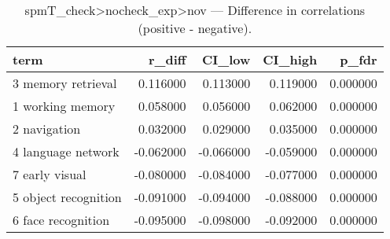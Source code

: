 \begin{table}
\caption{spmT_check>nocheck_exp>nov — Difference in correlations (positive - negative).}
\label{tab:spmT_check>nocheck_exp>nov_diff}
\begin{tabular}{lrrrr}
\toprule
term & r\_diff & CI\_low & CI\_high & p\_fdr \\
\midrule
3 memory retrieval & 0.116000 & 0.113000 & 0.119000 & 0.000000 \\
1 working memory & 0.058000 & 0.056000 & 0.062000 & 0.000000 \\
2 navigation & 0.032000 & 0.029000 & 0.035000 & 0.000000 \\
4 language network & -0.062000 & -0.066000 & -0.059000 & 0.000000 \\
7 early visual & -0.080000 & -0.084000 & -0.077000 & 0.000000 \\
5 object recognition & -0.091000 & -0.094000 & -0.088000 & 0.000000 \\
6 face recognition & -0.095000 & -0.098000 & -0.092000 & 0.000000 \\
\bottomrule
\end{tabular}
\end{table}
